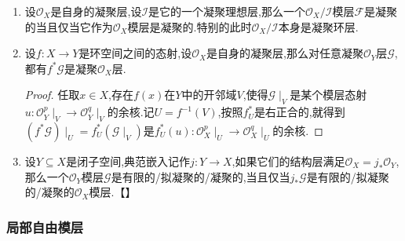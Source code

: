 \begin{enumerate}
\begin{proof}
		这件事就是因为有典范同构$(\mathrm{HOM}_{\mathscr{O}_X}(\mathscr{O}_X^p,\mathscr{O}_X^q))_x\cong\mathrm{Hom}_{\mathscr{O}_{X,x}}(\mathscr{O}_{X,x}^p,\mathscr{O}_{X,x}^q)$.
	\end{proof}
	\item 设$\mathscr{O}_X$是自身的凝聚层,设$\mathscr{I}$是它的一个凝聚理想层,那么一个$\mathscr{O}_X/\mathscr{I}$模层$\mathscr{F}$是凝聚的当且仅当它作为$\mathscr{O}_X$模层是凝聚的.特别的此时$\mathscr{O}_X/\mathscr{I}$本身是凝聚环层.
	\item 设$f:X\to Y$是环空间之间的态射,设$\mathscr{O}_X$是自身的凝聚层,那么对任意凝聚$\mathscr{O}_Y$层$\mathscr{G}$,都有$f^*\mathscr{G}$是凝聚$\mathscr{O}_X$层.
	\begin{proof}
		
		任取$x\in X$,存在$f(x)$在$Y$中的开邻域$V$,使得$\mathscr{G}\mid_V$是某个模层态射$u:\mathscr{O}_Y^p\mid_V\to\mathscr{O}_Y^q\mid_V$的余核.记$U=f^{-1}(V)$,按照$f_U^*$是右正合的,就得到$(f^*\mathscr{G})\mid_U=f_U^*(\mathscr{G}\mid_V)$是$f^*_U(u):\mathscr{O}_X^p\mid_U\to\mathscr{O}_X^q\mid_U$的余核.
	\end{proof}
	\item 设$Y\subseteq X$是闭子空间,典范嵌入记作$j:Y\to X$,如果它们的结构层满足$\mathscr{O}_X=j_*\mathscr{O}_Y$,那么一个$\mathscr{O}_Y$模层$\mathscr{G}$是有限的/拟凝聚的/凝聚的,当且仅当$j_*\mathscr{G}$是有限的/拟凝聚的/凝聚的$\mathscr{O}_X$模层.【】	
\end{enumerate}
\subsubsection{局部自由模层}

